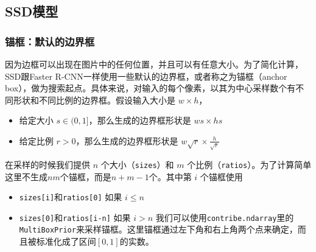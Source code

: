 \documentclass[11pt]{article}
\providecommand{\tightlist}{%
      \setlength{\itemsep}{0pt}\setlength{\parskip}{0pt}}
\begin{document}
    \subsection{SSD模型}\label{ssdux6a21ux578b}

\subsubsection{锚框：默认的边界框}\label{ux951aux6846ux9ed8ux8ba4ux7684ux8fb9ux754cux6846}

因为边框可以出现在图片中的任何位置，并且可以有任意大小。为了简化计算，SSD跟Faster
R-CNN一样使用一些默认的边界框，或者称之为锚框（anchor
box），做为搜索起点。具体来说，对输入的每个像素，以其为中心采样数个有不同形状和不同比例的边界框。假设输入大小是
\(w \times h\)，

\begin{itemize}
\tightlist
\item
  给定大小 \(s\in (0,1]\)，那么生成的边界框形状是 \(ws \times hs\)
\item
  给定比例 \(r > 0\)，那么生成的边界框形状是
  \(w\sqrt{r} \times \frac{h}{\sqrt{r}}\)
\end{itemize}

在采样的时候我们提供 \(n\) 个大小（\texttt{sizes}）和 \(m\)
个比例（\texttt{ratios}）。为了计算简单这里不生成\(nm\)个锚框，而是\(n+m-1\)个。其中第
\(i\) 个锚框使用

\begin{itemize}
\tightlist
\item
  \texttt{sizes{[}i{]}}和\texttt{ratios{[}0{]}} 如果 \(i\le n\)
\item
  \texttt{sizes{[}0{]}}和\texttt{ratios{[}i-n{]}} 如果 \(i>n\)
  我们可以使用\texttt{contribe.ndarray}里的\texttt{MultiBoxPrior}来采样锚框。这里锚框通过左下角和右上角两个点来确定，而且被标准化成了区间\([0,1]\)的实数。
\end{itemize}
\end{document}
